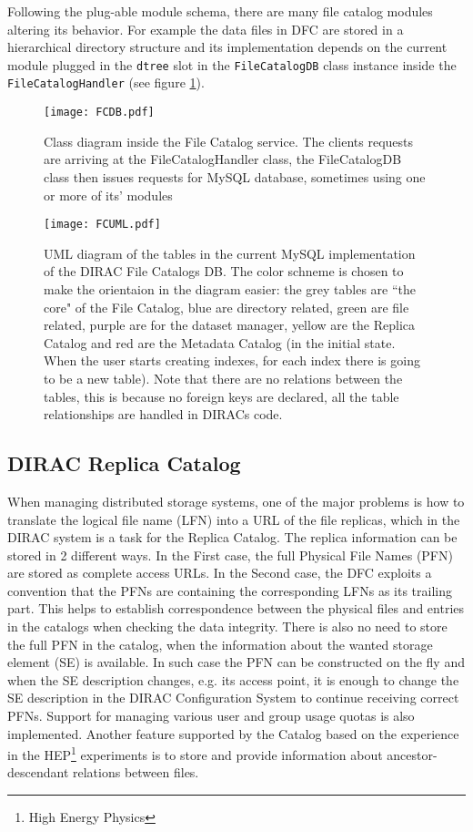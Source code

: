 Following the plug-able module schema, there are many file catalog modules altering its behavior. For example the 
data files in DFC are stored in a hierarchical directory structure and its implementation depends on the current
module plugged in the \texttt{dtree} slot in the \texttt{FileCatalogDB} class instance inside the 
\texttt{FileCatalogHandler} (see figure \ref{fig:FCClasses}). 

\begin{figure}[h]
	\centering
	\texttt{[image: FCDB.pdf]}
	\caption{Class diagram inside the File Catalog service. The clients requests are arriving at the 
	FileCatalogHandler class, the FileCatalogDB class then issues requests for MySQL database, sometimes using one
	or more of its' modules}
	\label{fig:FCClasses}
\end{figure}

\begin{figure}[b]
	\centering
	\texttt{[image: FCUML.pdf]}
	\caption{UML diagram of the tables in the current MySQL implementation of the DIRAC File Catalogs DB. The color 
	schneme is chosen to make the orientaion in the diagram easier: the grey tables are ``the core" of the File Catalog, blue are
	directory related, green are file related, purple are for the dataset manager, yellow are the Replica Catalog
	and red are the Metadata Catalog (in the initial state. When the user starts creating indexes, for each 
	index there is going to be a new table). Note that there are no relations between the tables, this is because
	no foreign keys are declared, all the table relationships are handled in DIRACs code.}
	\label{fig:FCMySQLUML}
\end{figure}

\subsection{DIRAC Replica Catalog}

When managing distributed storage systems, one of the major problems is how to translate the logical 
file name (LFN) into a URL of the file replicas, which in the DIRAC system is a task for the Replica
Catalog. The replica information can be stored in 2 different ways. In the First case, the full Physical File
Names (PFN) are stored as complete access URLs. In the Second case, the DFC exploits a convention
that the PFNs are containing the corresponding LFNs as its trailing part. 
This helps to establish correspondence between the physical files and entries in the catalogs when checking 
the data integrity. There is also no need to store the full PFN in the catalog, when
the information about the wanted storage element (SE) is available. In such case the PFN can be constructed on 
the fly and when the SE description changes, e.g. its access point, it is enough to change the SE description in the DIRAC 
Configuration System to continue receiving correct PFNs. Support for managing various user and group usage 
quotas is also implemented. Another feature supported by the Catalog based on the experience in 
the HEP\footnote{High Energy Physics} experiments is to store and provide information about ancestor-descendant 
relations between files. 

